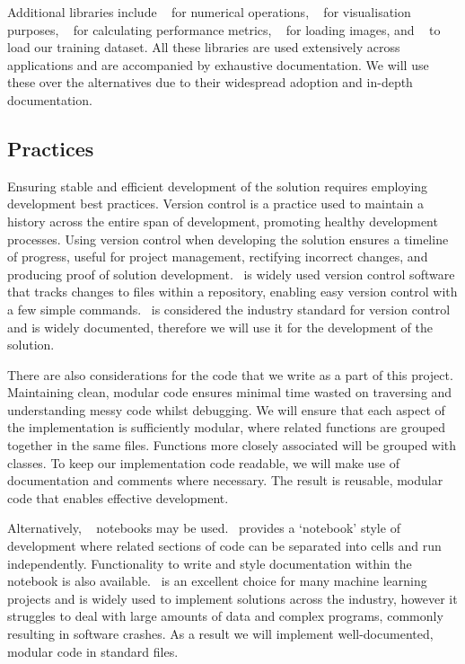 Additional  libraries include ~\cite{numpy} for numerical operations, ~\cite{matplotlib} for visualisation purposes, ~\cite{scikitimage} for calculating performance metrics, ~\cite{openCV} for loading images, and ~\cite{tensorflowDatasets} to load our training dataset. All these libraries are used extensively across  applications and are accompanied by exhaustive documentation. We will use these over the alternatives due to their widespread adoption and in-depth documentation.

\subsection{Practices}
Ensuring stable and efficient development of the solution requires employing development best practices. Version control is a practice used to maintain a history across the entire span of development, promoting healthy development processes. Using version control when developing the solution ensures a timeline of progress, useful for project management, rectifying incorrect changes, and producing proof of solution development.\  is widely used version control software that tracks changes to files within a repository, enabling easy version control with a few simple commands.\  is considered the industry standard for version control and is widely documented, therefore we will use it for the development of the solution.

There are also considerations for the code that we write as a part of this project. Maintaining clean, modular code ensures minimal time wasted on traversing and understanding messy code whilst debugging. We will ensure that each aspect of the implementation is sufficiently modular, where related functions are grouped together in the same  files. Functions more closely associated will be grouped with  classes. To keep our implementation code readable, we will make use of documentation and comments where necessary. The result is reusable, modular code that enables effective development.

Alternatively, ~\cite{jupyter} notebooks may be used.\  provides a `notebook' style of development where related sections of code can be separated into cells and run independently. Functionality to write and style documentation within the notebook is also available.\  is an excellent choice for many machine learning projects and is widely used to implement solutions across the industry, however it struggles to deal with large amounts of data and complex programs, commonly resulting in software crashes. As a result we will implement well-documented, modular code in standard  files.

